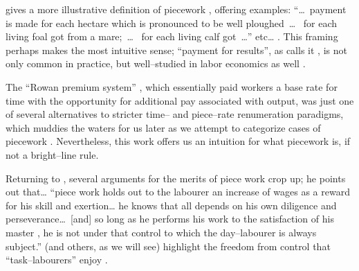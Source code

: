 \documentclass[trackingWork]{subfiles}
\begin{document}
\citeauthor{10.2307/2338394} gives a more illustrative definition of piecework%
, offering examples:
``\dots~payment is made for each hectare which is pronounced to be well ploughed~\dots~
for each living foal got from a mare;~\dots~
for each living calf got~\dots'' etc\dots
\cite{10.2307/2338394}.
This framing perhaps makes the most intuitive sense;
``payment for results'', as \citeauthor{10.2307/2338394} calls it%
, is not only common in practice, but well--studied in labor economics as well
\cite{Figlio2007901,weitzman1976new,10.2307/3003414,BJIR:BJIR038}.

The ``Rowan premium system''%
, which essentially paid workers a base rate for time with the opportunity for additional pay associated with output,
was just one of several alternatives to stricter time-- and piece--rate renumeration paradigms, which
muddies the waters for us later as we attempt to categorize cases of piecework
\cite{rowan1901premium}. 
Nevertheless,
this work offers us an intuition for what piecework is, if not a bright--line rule. 

Returning to
\citeauthor{hughRaynbirdTaskWork}, several arguments for the merits of piece work%
crop up; he points out that\dots
``piece work holds out to the labourer an increase of wages as a reward for his skill and exertion\dots
he knows that all depends on his own diligence and perseverance\dots~[and]
so long as he performs his work to the satisfaction of his master%
, he is not under that control to which the day--labourer is always subject.''
\citeauthor{hughRaynbirdTaskWork} (and others, as we will see)
highlight the freedom from control that ``task--labourers'' enjoy
\cite{hughRaynbirdTaskWork,rowan1901premium}.
\end{document}

